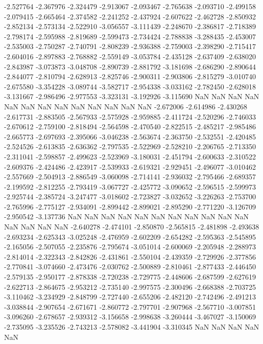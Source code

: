 -2.527764
-2.367976
-2.324479
-2.913067
-2.093467
-2.765638
-2.093710
-2.499158
-2.079415
-2.665464
-2.374582
-2.241252
-2.437924
-2.607622
-2.462728
-2.850932
-2.852134
-2.573134
-2.522910
-3.056557
-3.111439
-2.248670
-2.386817
-2.718389
-2.798174
-2.595988
-2.819689
-2.599473
-2.734424
-2.788838
-3.288435
-2.453007
-2.535003
-2.750287
-2.740791
-2.808239
-2.936388
-2.759003
-2.398290
-2.715417
-2.604016
-2.897883
-2.768882
-2.559149
-3.053784
-2.435128
-2.637409
-2.638020
-2.843987
-3.073873
-3.048708
-2.890739
-2.881792
-3.181698
-2.686290
-2.890644
-2.844077
-2.810794
-2.628913
-2.825746
-2.900311
-2.903806
-2.815279
-3.010740
-2.675580
-3.354228
-3.089744
-3.582717
-2.954338
-3.033162
-2.782450
-2.628018
-3.131667
-2.986496
-2.977553
-3.323131
-3.192926
-3.115690
NaN
NaN
NaN
NaN
NaN
NaN
NaN
NaN
NaN
NaN
NaN
NaN
NaN
-2.672006
-2.614986
-2.430268
-2.617731
-2.883505
-2.567933
-2.575928
-2.959885
-2.411724
-2.520296
-2.746033
-2.670612
-2.759100
-2.818494
-2.564598
-2.470540
-2.822515
-2.485217
-2.985486
-2.665773
-2.697693
-2.395066
-3.046238
-2.563674
-2.363750
-2.532551
-2.420485
-2.524526
-2.613835
-2.636362
-2.797535
-2.522969
-2.528210
-2.206765
-2.713350
-2.311041
-2.598857
-2.499623
-2.523969
-3.180031
-2.451794
-2.600633
-2.310522
-2.609376
-2.424486
-2.423917
-2.539933
-2.619321
-2.929451
-2.496077
-3.010462
-2.557669
-2.504913
-2.886549
-3.060098
-2.714141
-2.936032
-2.795466
-2.689357
-2.199592
-2.812255
-2.793419
-3.067727
-2.425772
-3.090652
-2.596515
-2.599973
-2.925744
-2.385724
-3.247477
-3.018602
-2.723827
-3.032652
-3.226263
-2.753700
-2.765996
-2.775127
-2.934091
-2.899442
-2.899021
-2.895290
-2.771220
-3.126709
-2.950542
-3.137736
NaN
NaN
NaN
NaN
NaN
NaN
NaN
NaN
NaN
NaN
NaN
NaN
NaN
NaN
NaN
-2.640278
-2.474101
-2.850870
-2.565815
-2.481898
-2.493638
-2.693234
-2.625343
-3.025248
-2.476959
-2.602209
-2.654282
-2.595363
-2.545895
-2.165056
-2.507055
-2.235876
-2.795674
-3.051014
-2.600069
-2.205948
-2.288973
-2.814014
-2.322343
-2.842826
-2.431861
-2.550104
-2.439359
-2.729926
-2.377856
-2.770841
-3.074660
-2.473476
-2.030762
-2.500889
-2.810461
-2.877433
-2.446450
-2.579135
-2.950177
-2.878338
-2.720238
-2.729775
-2.448606
-2.687599
-2.627619
-2.622713
-2.864675
-2.953212
-2.735140
-2.997575
-2.300496
-2.668388
-2.703725
-3.110462
-3.234929
-2.848799
-2.727440
-2.655206
-2.482120
-2.742496
-2.491213
-3.038844
-2.907654
-2.671671
-2.860772
-2.797701
-2.907968
-2.567710
-3.007851
-3.096260
-2.678657
-2.939312
-3.156658
-2.998638
-3.260444
-3.467027
-3.150069
-2.735095
-3.235526
-2.743213
-2.578082
-3.441904
-3.310345
NaN
NaN
NaN
NaN
NaN
